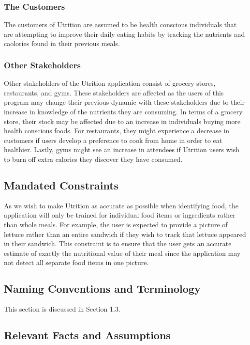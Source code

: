 \documentclass[12pt]{article}
\begin{document}
\subsubsection{The Customers} 

The customers of Utrition are assumed to be health conscious individuals that are attempting to improve their daily eating habits by tracking the nutrients and caolories found in their previous meals. 

\subsubsection{Other Stakeholders}
Other stakeholders of the Utrition application consist of grocery stores, restaurants, and gyms. These stakeholders are affected as the users of this program may change their previous dynamic with these stakeholders due to their increase in knowledge of the nutrients they are consuming. In terms of a grocery store, their stock may be affected due to an increase in individuals buying more health conscious foods. For restaurants, they might experience a decrease in customers if users develop a preference to cook from home in order to eat healthier. Lastly, gyms might see an increase in attendees if Utrition users wish to burn off extra calories they discover they have consumed.

\subsection{Mandated Constraints} 

As we wish to make Utrition as accurate as possible when identifying food, the application will only be trained for individual food items or ingredients rather than whole meals. For example, the user is expected to provide a picture of lettuce rather than an entire sandwich if they wish to track that lettuce appeared in their sandwich. This constraint is to ensure that the user gets an accurate estimate of exactly the nutritional value of their meal since the application may not detect all separate food items in one picture. 

\subsection{Naming Conventions and Terminology}
This section is discussed in Section 1.3.

\subsection{Relevant Facts and Assumptions } 
\end{document}
